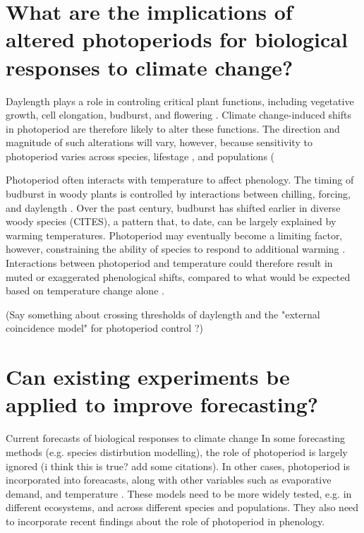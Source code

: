 \documentclass{article}
\begin{document}
\section*{What are the implications of altered photoperiods for biological responses to climate change?}
\par Daylength plays a role in controling critical plant functions, including vegetative growth, cell elongation, budburst, and flowering \citep{Linkosalo:2006aa,erwin1998,sidaway2010, Hsu:2011,Heide:2011aa,Ashby:1962aa,Heide:2012aa,mimura2007}. Climate change-induced shifts in photoperiod are therefore likely to alter these functions. The direction and magnitude of such alterations will vary, however, because sensitivity to photoperiod varies across species\citep{Sanz-Perez:2009aa, zohner2016}, lifestage \citep{Partanen:2005aa}, and populations (%
\par Photoperiod often interacts with temperature to affect phenology. The timing of budburst in woody plants is controlled by interactions between chilling, forcing, and daylength \citep{flynn2018,Heide:2008aa, zohner2016}. Over the past century, budburst has shifted earlier in diverse woody species (CITES), a pattern that, to date, can be largely explained by warming temperatures. Photoperiod may eventually become a limiting factor, however, constraining the ability of species to respond to additional warming \citep{koerner2010b,vitasse2013, Morin:2010aa,Nienstaedt:1966aa}. Interactions between photoperiod and temperature could therefore result in muted or exaggerated phenological shifts, compared to what would be expected based on temperature change alone \citep{wareing1956,mimura2007,koerner2010b}.

\par (Say something about crossing thresholds of daylength and the "external coincidence model" for photoperiod control \citep{bastow2002,kobayashi2007,andres2012,Singh:2017}?)

\section*{Can existing experiments be applied to improve forecasting?}
\par Current forecasts of biological responses to climate change In some forecasting methods (e.g. species distirbution modelling), the role of photoperiod is largely ignored (i think this is true? add some citations). In other cases, photoperiod is incorporated into foreacasts, along with other variables such as evaporative demand, and temperature \citep [e.g. ED] []{jolly2005, medvigy2013}. These models need to be more widely tested, e.g. in different ecosystems, and across different species and populations. They also need to incorporate recent findings about the role of photoperiod in phenology.     
\end{document}
